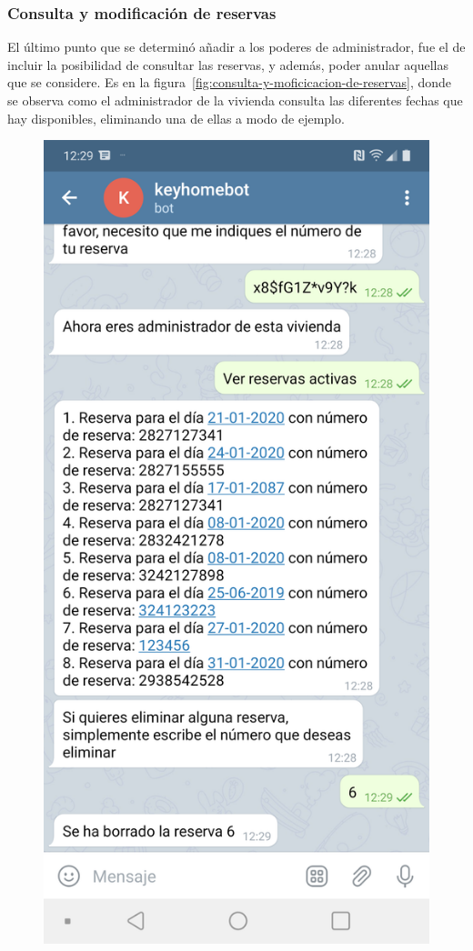 \subsubsection{Consulta y modificación de reservas}

El último punto que se determinó añadir a los poderes de administrador, fue el de incluir la posibilidad de consultar las reservas, y además, poder anular aquellas que se considere. Es en la figura~\ref{fig:consulta-y-moficicacion-de-reservas}, donde se observa como el administrador de la vivienda consulta las diferentes fechas que hay disponibles, eliminando una de ellas a modo de ejemplo.

\begin{figure}[tbp]
\centering
\includegraphics[scale=0.15]{fig/Consulta-y-modificacion-reservas.png}

\end{figure}
